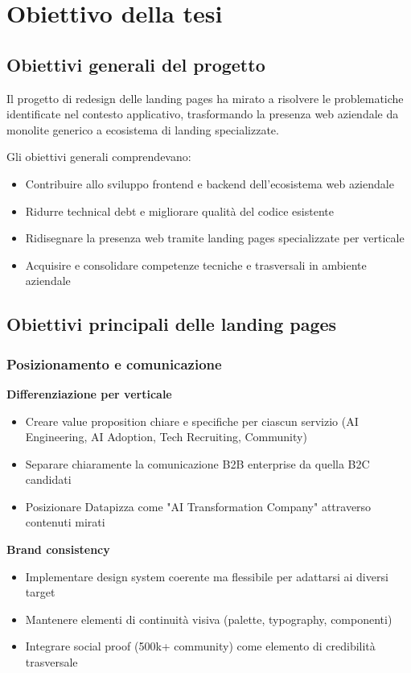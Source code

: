 \chapter{Obiettivo della tesi}

\section{Obiettivi generali del progetto}
Il progetto di redesign delle landing pages ha mirato a risolvere le problematiche identificate nel contesto applicativo, trasformando la presenza web aziendale da monolite generico a ecosistema di landing specializzate.

Gli obiettivi generali comprendevano:
\begin{itemize}
  \item Contribuire allo sviluppo frontend e backend dell'ecosistema web aziendale
  \item Ridurre technical debt e migliorare qualità del codice esistente
  \item Ridisegnare la presenza web tramite landing pages specializzate per verticale
  \item Acquisire e consolidare competenze tecniche e trasversali in ambiente aziendale
\end{itemize}

\section{Obiettivi principali delle landing pages}

\subsection{Posizionamento e comunicazione}
\textbf{Differenziazione per verticale}
\begin{itemize}
  \item Creare value proposition chiare e specifiche per ciascun servizio (AI Engineering, AI Adoption, Tech Recruiting, Community)
  \item Separare chiaramente la comunicazione B2B enterprise da quella B2C candidati
  \item Posizionare Datapizza come "AI Transformation Company" attraverso contenuti mirati
\end{itemize}

\textbf{Brand consistency}
\begin{itemize}
  \item Implementare design system coerente ma flessibile per adattarsi ai diversi target
  \item Mantenere elementi di continuità visiva (palette, typography, componenti)
  \item Integrare social proof (500k+ community) come elemento di credibilità trasversale
\end{itemize}

